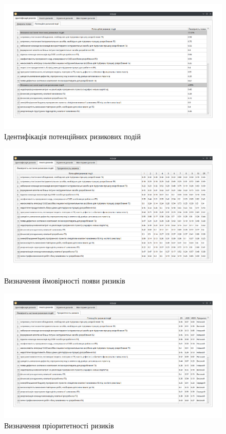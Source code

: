 \documentclass[14pt]{extreport}
\begin{document}
\begin{normalsize}
	\begin{figure}[H]
		\centering
		\includegraphics[scale=0.45]{2}
		\caption{Ідентифікація потенційних ризикових подій}
	\end{figure}
	
	\begin{figure}[H]
		\centering
		\includegraphics[scale=0.45]{3}
		\caption{Визначення ймовірності появи ризиків}
	\end{figure}
	
	\begin{figure}[H]
		\centering
		\includegraphics[scale=0.45]{4}
		\caption{Визначення пріоритетності ризиків}
	\end{figure}
	

\end{normalsize}
\end{document}
